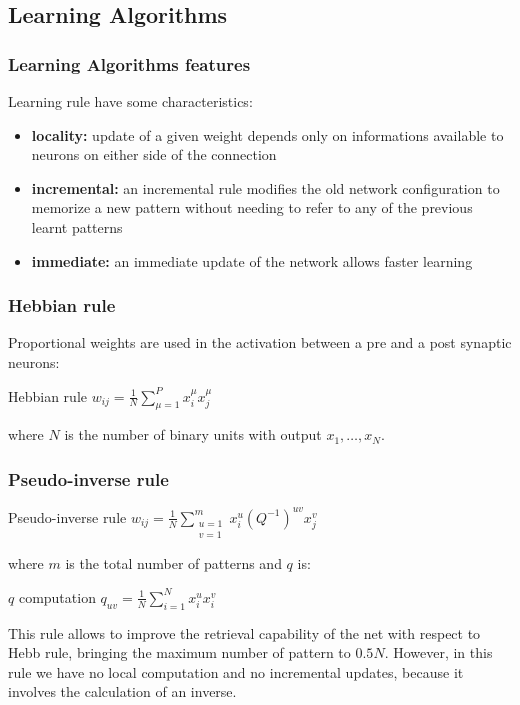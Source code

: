 \documentclass{beamer}
\begin{document}

\subsection{Learning Algorithms}

\begin{frame}
\frametitle{Learning Algorithms features}
Learning rule have some characteristics:
\begin{itemize}
\item\textbf{locality:} update of a given weight depends only on informations available to neurons on either side of the connection
\item\textbf{incremental:} an incremental rule modifies the old network configuration to memorize a new pattern without needing to refer to any of the previous learnt patterns
\item\textbf{immediate:} an immediate update of the network allows faster learning
\end{itemize}
\end{frame}



\begin{frame}
\frametitle{Hebbian rule}
Proportional weights are used in the activation between a pre and a post synaptic neurons:
\begin{block}{Hebbian rule}
$w_{ij} = \frac{1}{N} \sum_{\mu = 1}^P x_i^\mu x_j^\mu$
\end{block}
where $N$ is the number of binary units with output $x_1,\ldots,x_N$.
\end{frame}


\begin{frame}
\frametitle{Pseudo-inverse rule}
\begin{block}{Pseudo-inverse rule}
$w_{ij} = \frac{1}{N} \sum_{\substack{u=1\\v=1    }}^m x_i^u (Q^{-1})^{uv} x_j^v$
\end{block}
where $m$ is the total number of patterns and $q$ is:
\begin{block}{$q$ computation}
$q_{uv} = \frac{1}{N} \sum_{i=1}^N x_i^u x_i^v$
\end{block}
This rule allows to improve the retrieval capability of the net with respect to Hebb rule, bringing the maximum number of pattern to $0.5N$. However, in this rule we have no local computation and no incremental updates, because it involves the calculation of an inverse.
\end{frame}
\end{document}
